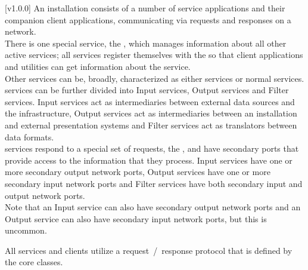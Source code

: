 [v1.0.0]
An \mplusm{} installation consists of a number of service applications and their companion
client applications, communicating via \mplusm{} requests and responses on a \yarp{}
network.\\

There is one special service, the , which manages
information about all other active services; all services register themselves with the
 so that client applications and utilities can get
information about the service.\\

Other services can be, broadly, characterized as either  services or normal
services.
 services can be further divided into Input services, Output services and
Filter services.
Input services act as intermediaries between external data sources and the \mplusm{}
infrastructure, Output services act as intermediaries between an \mplusm{}
installation and external presentation systems and Filter services act as translators
between data formats.\\

 services respond to a special set of requests, the
, and have secondary \yarp{}
ports that provide access to the information that they process.
Input services have one or more secondary output \yarp{} network ports, Output services
have one or more secondary input \yarp{} network ports and Filter services have both
secondary input and output \yarp{} network ports.\\

Note that an Input service can also have secondary output \yarp{} network ports and an
Output service can also have secondary input \yarp{} network ports, but this is uncommon.

All services and clients utilize a request~/~response protocol that is defined by the
\mplusm{}  core classes.\\


